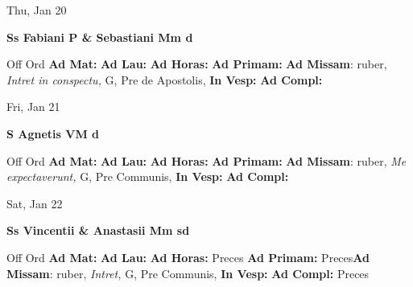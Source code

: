 \documentclass[10pt]{book}
\begin{document}
\begin{center}
\begin{minipage}{3.5in}
\vspace{2em}
\begin{center}Thu, Jan 20
\end{center}
\textbf{ \large Ss Fabiani P \& Sebastiani Mm
\textnormal{\normalsize d}}

\begin{justify}Off Ord
\textbf{Ad Mat: }
\textbf{Ad Lau: }
\textbf{Ad Horas: }
\textbf{Ad Primam: }\textbf{Ad Missam}: ruber, \textit{Intret in conspectu,} G, Pre de Apostolis, 
\textbf{In Vesp: }
\textbf{Ad Compl: }
\end{justify}
\end{minipage}
\end{center}

\begin{center}
\begin{minipage}{3.5in}
\vspace{2em}
\begin{center}Fri, Jan 21
\end{center}
\textbf{ \large S Agnetis VM
\textnormal{\normalsize d}}

\begin{justify}Off Ord
\textbf{Ad Mat: }
\textbf{Ad Lau: }
\textbf{Ad Horas: }
\textbf{Ad Primam: }\textbf{Ad Missam}: ruber, \textit{Me expectaverunt,} G, Pre Communis, 
\textbf{In Vesp: }
\textbf{Ad Compl: }
\end{justify}
\end{minipage}
\end{center}

\begin{center}
\begin{minipage}{3.5in}
\vspace{2em}
\begin{center}Sat, Jan 22
\end{center}
\textbf{ \large Ss Vincentii \& Anastasii Mm
\textnormal{\normalsize sd}}

\begin{justify}Off Ord
\textbf{Ad Mat: }
\textbf{Ad Lau: }
\textbf{Ad Horas: }Preces
\textbf{Ad Primam: }Preces\textbf{Ad Missam}: ruber, \textit{Intret,} G, Pre Communis, 
\textbf{In Vesp: }
\textbf{Ad Compl: }Preces
\end{justify}
\end{minipage}
\end{center}
\end{document}
